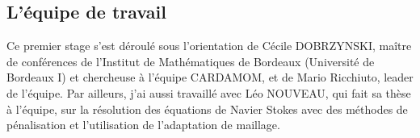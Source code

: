 \subsection{L'équipe de travail}

\indent Ce premier stage s'est déroulé sous l'orientation de Cécile DOBRZYNSKI, maître de conférences de l'Institut de Mathématiques de Bordeaux (Université de Bordeaux I) et chercheuse à l'équipe CARDAMOM, et de Mario Ricchiuto, leader de l'équipe. Par ailleurs, j'ai aussi travaillé avec Léo NOUVEAU, qui fait sa thèse à l'équipe, sur la résolution des équations de Navier Stokes avec des méthodes de pénalisation et l'utilisation de l'adaptation de maillage.

%
%

